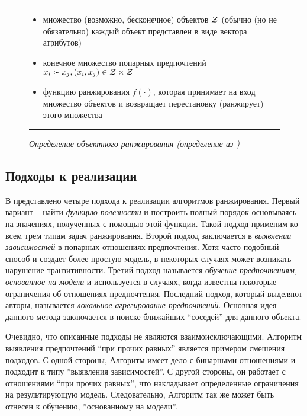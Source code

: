 		\begin{figure}[h]
			\hrule
			\begin{description}[nosep]
				\item[Дано:] \null\leavevmode
				\begin{itemize}[itemsep=0pt,leftmargin=2ex,label=\textbf{---}]
					\item множество (возможно, бесконечное) объектов $\mathcal{Z}$ (обычно (но не обязательно) каждый объект представлен в виде вектора атрибутов)
					\item конечное множество попарных предпочтений $x_i \succ x_j, (x_i, x_j) \in \mathcal{Z} \times \mathcal{Z}$
				\end{itemize}
				\item[Найти:] \null\leavevmode
				\begin{itemize}[itemsep=0pt,leftmargin=2ex,label=\textbf{---}]
					\item функцию ранжирования $f(\cdot)$, которая принимает на вход множество объектов и возвращает перестановку (ранжирует) этого множества
				\end{itemize}
			\end{description} 
			\hrule
			\caption{\it Определение объектного ранжирования (определение из \cite[Рис.~3]{plbook:Introduction:2010})}
			\label{fig:object_ranking}
		\end{figure}
	
	\subsection{Подходы к реализации}
		В \cite{plbook:Introduction:2010} представлено четыре подхода к реализации алгоритмов ранжирования. 
		Первый вариант – найти \emph{функцию полезности} и построить полный порядок основываясь на значениях, полученных с помощью этой функции. Такой подход применим ко всем трем типам задач ранжирования. 
		Второй подход заключается в \emph{выявлении зависимостей} в попарных отношениях предпочтения. Хотя часто подобный способ и создает более простую модель, в некоторых случаях может возникать нарушение транзитивности\cite[стр.~10]{plbook:Introduction:2010}. 
		Третий подход называется \emph{обучение предпочтениям, основанное на модели} и используется в случаях, когда известны некоторые ограничения об отношениях предпочтения. 
		Последний подход, который выделяют авторы, называется \emph{локальное агрегирование предпочтений}. Основная идея данного метода заключается в поиске ближайших \enquote{соседей} для данного объекта.
		
		Очевидно, что описанные подходы не являются взаимоисключающими. Алгоритм выявления предпочтений \enquote{при прочих равных} является примером смешения подходов. С одной стороны, Алгоритм имеет дело с бинарными отношениями и подходит к типу ''выявления зависимостей''. С другой стороны, он работает с отношениями \enquote{при прочих равных}, что накладывает определенные ограничения на результирующую модель. Следовательно, Алгоритм так же может быть отнесен к обучению, ''основанному на модели''.
	
